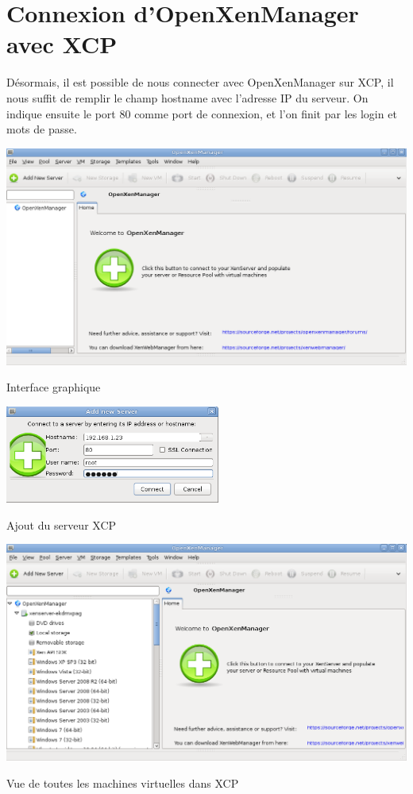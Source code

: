 \section{Connexion d'OpenXenManager avec XCP}
Désormais, il est possible de nous connecter avec OpenXenManager sur XCP, il nous suffit de remplir le champ hostname avec l'adresse IP du serveur.
On indique ensuite le port 80 comme port de connexion, et l'on finit par les login et mots de passe.
\begin{center}
\includegraphics[width=400pt]{images/xenmanager.png}
\end{center}
\begin{center}
Interface graphique
\end{center}
\begin{center}
\includegraphics[width=200pt]{images/addserveur.png}
\end{center}
\begin{center}
Ajout du serveur XCP
\end{center}
\begin{center}
\includegraphics[width=400pt]{images/final.png}
\end{center}
\begin{center}
Vue de toutes les machines virtuelles dans XCP
\end{center}

